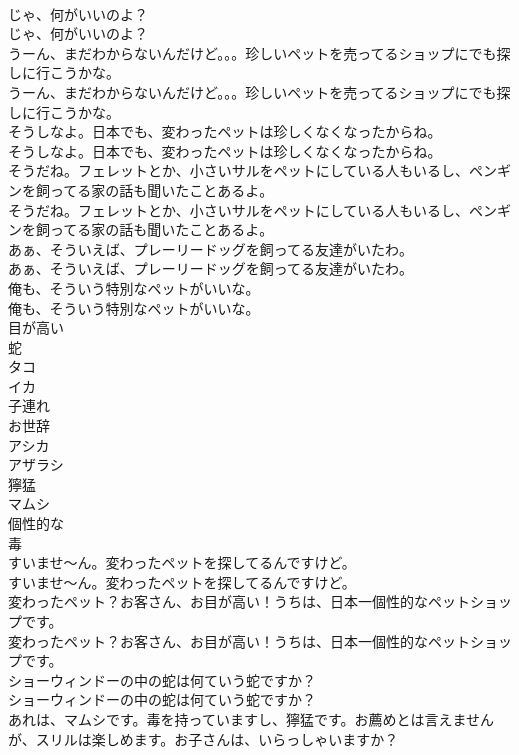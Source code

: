 \documentclass[8pt]{extreport}
\begin{document}
\begin{CJK}{UTF8}{min}
\\	じゃ、何がいいのよ？	
\\	じゃ、何がいいのよ？ 
\\	うーん、まだわからないんだけど。。。珍しいペットを売ってるショップにでも探しに行こうかな。	
\\	うーん、まだわからないんだけど。。。珍しいペットを売ってるショップにでも探しに行こうかな。 
\\	そうしなよ。日本でも、変わったペットは珍しくなくなったからね。	
\\	そうしなよ。日本でも、変わったペットは珍しくなくなったからね。 
\\	そうだね。フェレットとか、小さいサルをペットにしている人もいるし、ペンギンを飼ってる家の話も聞いたことあるよ。	
\\	そうだね。フェレットとか、小さいサルをペットにしている人もいるし、ペンギンを飼ってる家の話も聞いたことあるよ。 
\\	あぁ、そういえば、プレーリードッグを飼ってる友達がいたわ。	
\\	あぁ、そういえば、プレーリードッグを飼ってる友達がいたわ。 
\\	俺も、そういう特別なペットがいいな。	
\\	俺も、そういう特別なペットがいいな。 
\\	目が高い
\\	蛇
\\	タコ
\\	イカ
\\	子連れ
\\	お世辞
\\	アシカ
\\	アザラシ
\\	獰猛
\\	マムシ
\\	個性的な
\\	毒
\\	すいませ～ん。変わったペットを探してるんですけど。	
\\	すいませ～ん。変わったペットを探してるんですけど。 
\\	変わったペット？お客さん、お目が高い！うちは、日本一個性的なペットショップです。	
\\	変わったペット？お客さん、お目が高い！うちは、日本一個性的なペットショップです。 
\\	ショーウィンドーの中の蛇は何ていう蛇ですか？	
\\	ショーウィンドーの中の蛇は何ていう蛇ですか？ 
\\	あれは、マムシです。毒を持っていますし、獰猛です。お薦めとは言えませんが、スリルは楽しめます。お子さんは、いらっしゃいますか？	

\end{CJK}
\end{document}
